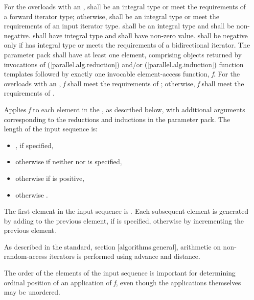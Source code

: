 \begin{itemdescr}
\pnum
\requires For the overloads with an ,  shall be an integral type or meet the requirements of a forward iterator type; otherwise,  shall be an integral type or meet the requirements of an input iterator type.  shall be an integral type and  shall be non-negative.  shall have integral type and  shall have non-zero value.  shall be negative only if  has integral type or meets the requirements of a bidirectional iterator. The  parameter pack shall have at least one element, comprising objects returned by invocations of  ([parallel.alg.reduction]) and/or  ([parallel.alg.induction]) function templates followed by exactly one invocable element-access function, {\em f}. For the overloads with an , {\em f} shall meet the requirements of ; otherwise, {\em f} shall meet the requirements of .

\pnum
\effects Applies {\em f} to each element in the , as described below, with additional arguments corresponding to the reductions and inductions in the  parameter pack. The length of the input sequence is:

\begin{itemize}
\item {}, if specified,

\item otherwise  if neither  nor  is specified,

\item otherwise  if  is positive,

\item otherwise .
\end{itemize}

The first element in the input sequence is . Each subsequent element is generated by adding  to the previous element, if  is specified, otherwise by incrementing the previous element.
\begin{note}As described in the \Cpp standard, section [algorithms.general], arithmetic on non-random-access iterators is performed using advance and distance.\end{note}
\begin{note}The order of the elements of the input sequence is important for determining ordinal position of an application of {\em f}, even though the applications themselves may be unordered.\end{note}


\end{itemdescr}
